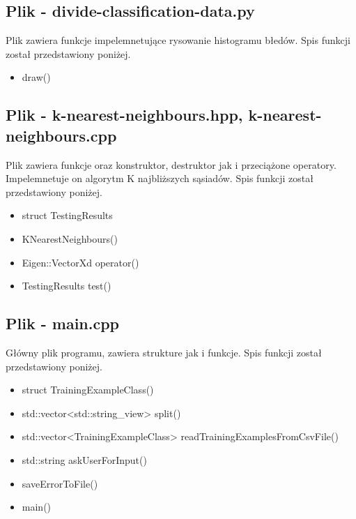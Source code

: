 \documentclass{classrep}
\begin{document}
{        \subsection{Plik - divide-classification-data.py}
        {
            Plik zawiera funkcje impelemnetujące rysowanie histogramu błedów.
            Spis funkcji został przedstawiony poniżej.
            \begin{itemize}
                \item draw()
            \end{itemize}
        }

        \subsection{Plik - k-nearest-neighbours.hpp, k-nearest-neighbours.cpp}
        {
            Plik zawiera funkcje oraz konstruktor, destruktor jak i przeciążone operatory.
            Impelemnetuje on algorytm K najbliższych sąsiadów.
            Spis funkcji został przedstawiony poniżej.
            \begin{itemize}
                \item struct TestingResults
                \item KNearestNeighbours()
                \item Eigen::VectorXd operator()
                \item TestingResults test()
            \end{itemize}
        }

        \subsection{Plik - main.cpp}
        {
            Główny plik programu, zawiera strukture jak i funkcje.
            Spis funkcji został przedstawiony poniżej.
            \begin{itemize}
                \item struct TrainingExampleClass()
                \item std::vector<std::string\_view> split()
                \item std::vector<TrainingExampleClass> readTrainingExamplesFromCsvFile()
                \item std::string askUserForInput()
                \item saveErrorToFile()
                \item main()
            \end{itemize}
        }

}
\end{document}
